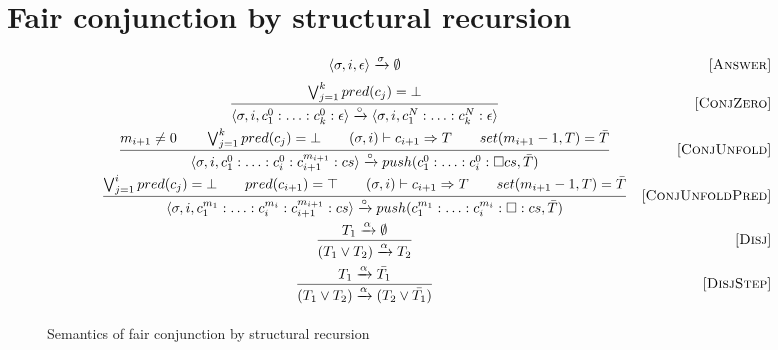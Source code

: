 \section{Fair conjunction by structural recursion}

\begin{figure}[h!]
\[\begin{array}{cr}

      {\langle \sigma, i, \epsilon \rangle \xrightarrow{\sigma} \emptyset}  
&     \mbox{[\textsc{Answer}]} \\[2mm]
\dfrac{\bigvee_{j=1}^k pred(c_j) = \bot}
      {\langle \sigma, i, c_1^0 : \ldots : c_k^0 : \epsilon \rangle \xrightarrow{\circ} \langle \sigma, i, c_1^N : \ldots : c_k^N : \epsilon \rangle}
&     \mbox{[\textsc{ConjZero}]} \\[4mm]
\dfrac{m_{i+1} \not= 0 \qquad \bigvee_{j=1}^k pred(c_j) = \bot \qquad (\sigma, i) \vdash c_{i+1} \Rightarrow T \qquad set(m_{i+1} - 1, T) = \bar{T}}
      {\langle \sigma, i, c_1^0 : \ldots : c_i^0 : c_{i+1}^{m_{i+1}} : cs \rangle \xrightarrow{\circ} push(c_1^0 : \ldots : c_i^0 : \Box cs, \bar{T})}
&     \mbox{[\textsc{ConjUnfold}]} \\[4mm]
\dfrac{\bigvee_{j=1}^i pred(c_j) = \bot \qquad pred(c_{i+1}) = \top \qquad (\sigma, i) \vdash c_{i+1} \Rightarrow T \qquad set(m_{i+1} - 1, T) = \bar{T}}
      {\langle \sigma, i, c_1^{m_1} : \ldots : c_i^{m_i} : c_{i+1}^{m_{i+1}} : cs \rangle \xrightarrow{\circ} push(c_1^{m_1} : \ldots : c_i^{m_i} : \Box : cs, \bar{T})}
&     \mbox{[\textsc{ConjUnfoldPred}]} \\[4mm]
\dfrac{T_1 \xrightarrow{\alpha} \emptyset}
      {(T_1 \lor T_2) \xrightarrow{\alpha} T_2}
&     \mbox{[\textsc{Disj}]} \\[4mm]
\dfrac{T_1 \xrightarrow{\alpha} \bar{T_1}}
      {(T_1 \lor T_2) \xrightarrow{\alpha} (T_2 \lor\bar{T_1})}
&     \mbox{[\textsc{DisjStep}]} \\[4mm]
\end{array}\]
\caption{Semantics of fair conjunction by structural recursion}
\label{fair:structural-recursion-semantics}
\end{figure}

\FloatBarrier
